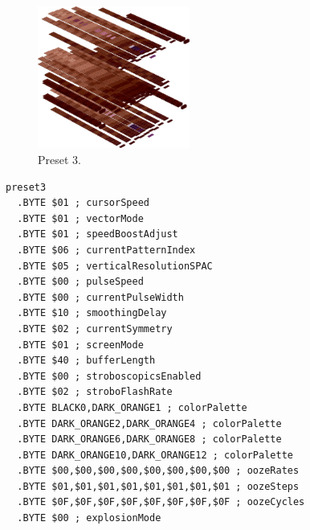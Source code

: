 \clearpage
\begin{minipage}[b]{0.48\linewidth}
\begin{figure}[H]                                                          
  \centering                                                             
  \begin{adjustbox}{width=5cm,center}                                   
  \includegraphics[width=5cm]{src/colorspace_presets/preset3-45.png}%
  \end{adjustbox}                                                        
\caption*{Preset 3.}                                           
\end{figure}                                                               
\end{minipage}
\hspace{0.1cm}
\begin{minipage}[b]{0.48\linewidth}                            
\begin{lstlisting}[basicstyle=\ttfamily\tiny]
preset3
  .BYTE $01 ; cursorSpeed
  .BYTE $01 ; vectorMode
  .BYTE $01 ; speedBoostAdjust
  .BYTE $06 ; currentPatternIndex
  .BYTE $05 ; verticalResolutionSPAC
  .BYTE $00 ; pulseSpeed
  .BYTE $00 ; currentPulseWidth
  .BYTE $10 ; smoothingDelay
  .BYTE $02 ; currentSymmetry
  .BYTE $01 ; screenMode
  .BYTE $40 ; bufferLength
  .BYTE $00 ; stroboscopicsEnabled
  .BYTE $02 ; stroboFlashRate
  .BYTE BLACK0,DARK_ORANGE1 ; colorPalette
  .BYTE DARK_ORANGE2,DARK_ORANGE4 ; colorPalette
  .BYTE DARK_ORANGE6,DARK_ORANGE8 ; colorPalette
  .BYTE DARK_ORANGE10,DARK_ORANGE12 ; colorPalette
  .BYTE $00,$00,$00,$00,$00,$00,$00,$00 ; oozeRates
  .BYTE $01,$01,$01,$01,$01,$01,$01,$01 ; oozeSteps
  .BYTE $0F,$0F,$0F,$0F,$0F,$0F,$0F,$0F ; oozeCycles
  .BYTE $00 ; explosionMode
\end{lstlisting}
\end{minipage}

\vspace*{-0.5cm}

